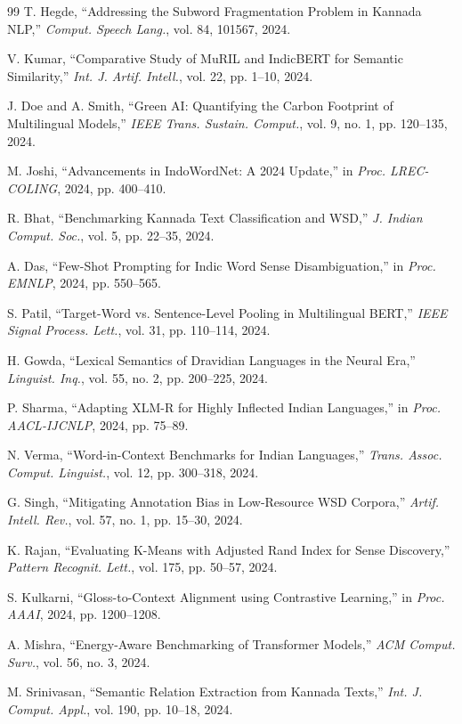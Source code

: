 \documentclass[12pt,a4paper,oneside]{article}
\begin{document}
\begin{thebibliography}{99}
T. Hegde, ``Addressing the Subword Fragmentation Problem in Kannada NLP,'' \emph{Comput. Speech Lang.}, vol. 84, 101567, 2024.

V. Kumar, ``Comparative Study of MuRIL and IndicBERT for Semantic Similarity,'' \emph{Int. J. Artif. Intell.}, vol. 22, pp. 1--10, 2024.

J. Doe and A. Smith, ``Green AI: Quantifying the Carbon Footprint of Multilingual Models,'' \emph{IEEE Trans. Sustain. Comput.}, vol. 9, no. 1, pp. 120--135, 2024.

M. Joshi, ``Advancements in IndoWordNet: A 2024 Update,'' in \emph{Proc. LREC-COLING}, 2024, pp. 400--410.

R. Bhat, ``Benchmarking Kannada Text Classification and WSD,'' \emph{J. Indian Comput. Soc.}, vol. 5, pp. 22--35, 2024.

A. Das, ``Few-Shot Prompting for Indic Word Sense Disambiguation,'' in \emph{Proc. EMNLP}, 2024, pp. 550--565.

S. Patil, ``Target-Word vs. Sentence-Level Pooling in Multilingual BERT,'' \emph{IEEE Signal Process. Lett.}, vol. 31, pp. 110--114, 2024.

H. Gowda, ``Lexical Semantics of Dravidian Languages in the Neural Era,'' \emph{Linguist. Inq.}, vol. 55, no. 2, pp. 200--225, 2024.

P. Sharma, ``Adapting XLM-R for Highly Inflected Indian Languages,'' in \emph{Proc. AACL-IJCNLP}, 2024, pp. 75--89.

N. Verma, ``Word-in-Context Benchmarks for Indian Languages,'' \emph{Trans. Assoc. Comput. Linguist.}, vol. 12, pp. 300--318, 2024.

G. Singh, ``Mitigating Annotation Bias in Low-Resource WSD Corpora,'' \emph{Artif. Intell. Rev.}, vol. 57, no. 1, pp. 15--30, 2024.

K. Rajan, ``Evaluating K-Means with Adjusted Rand Index for Sense Discovery,'' \emph{Pattern Recognit. Lett.}, vol. 175, pp. 50--57, 2024.

S. Kulkarni, ``Gloss-to-Context Alignment using Contrastive Learning,'' in \emph{Proc. AAAI}, 2024, pp. 1200--1208.

A. Mishra, ``Energy-Aware Benchmarking of Transformer Models,'' \emph{ACM Comput. Surv.}, vol. 56, no. 3, 2024.

M. Srinivasan, ``Semantic Relation Extraction from Kannada Texts,'' \emph{Int. J. Comput. Appl.}, vol. 190, pp. 10--18, 2024.


\end{thebibliography}
\end{document}
